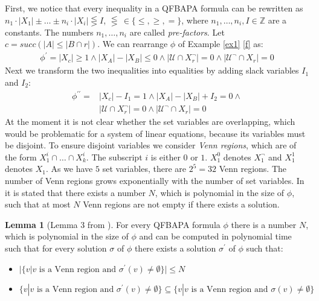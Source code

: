 \documentclass{book}
\theoremstyle{break}
\theoremstyle{definition}
\newtheorem{mylem}{Lemma}
\begin{document}
First, we notice that every inequality in a QFBAPA formula can be
rewritten as $n_1\cdot|X_1|\pm \dots \pm n_i\cdot|X_i|\lesseqgtr I$, $\lesseqgtr\,\in\{\leq,\geq,=\}$, where $n_1,\dots, n_i,I\in\mathbb{Z}$ are a constants. The numbers $n_1,\dots,n_i$ are called \textit{pre-factors}. Let $c={succ(|A|\leq |B\cap r|)}$. We can rearrange $\phi$   of Example \ref{ex1} \eqref{f} as:
\begin{align}
\phi^\prime=|X_{c}|\geq 1\wedge |X_A|- |X_B|\leq 0 \wedge |\mathcal{U}\cap X_r^\neg|=0\wedge |\mathcal{U}^\neg\cap X_r|=0
\end{align} 
Next we transform the two inequalities into equalities by adding slack variables $I_1$ and $I_2$:
\begin{align}
\phi^{\prime\prime}=&|X_{c}|- I_1= 1\wedge |X_A|-|X_B|+I_2= 0 \wedge \nonumber\\
&|\mathcal{U}\cap X_r^\neg|=0\wedge |\mathcal{U}^\neg\cap X_r|=0
\end{align}
At the moment it is not clear whether the set variables are overlapping, which would be problematic for a system of linear equations, because its variables must be disjoint. To ensure disjoint variables we consider \textit{Venn regions}, which are of the form $X^i_1\cap \dots \cap X^i_k$. The subscript $i$ is either $0$ or $1$. $X^0_1$ denotes $X^\neg_1$ and $X^1_1$ denotes $X_1$. As we have $5$ set variables, there are $2^5=32$ Venn regions. The number of Venn regions grows exponentially with the number of set variables. In \cite{4} it is stated that there exists a number $N$, which is polynomial in the size of $\phi$, such that at most $N$ Venn regions are not empty if there exists a solution.
\begin{mylem}[Lemma 3 from \cite{4}]
For every QFBAPA formula $\phi$ there is a number $N$, which is polynomial in the size of $\phi$ and can be computed in polynomial time such that for every solution $\sigma$ of $\phi$ there exists a solution $\sigma^\prime$ of $\phi$ such that:
\begin{itemize}
\item $|\{v|v\text{ is a Venn region and }\sigma^\prime(v)\neq \emptyset\}|\leq N$
\item $\{v|v\text{ is a Venn region and }\sigma^\prime(v)\neq \emptyset\}\subseteq \{v|v\text{ is a Venn region and }\sigma(v)\neq \emptyset\}$
\end{itemize}
\end{mylem}
\end{document}
